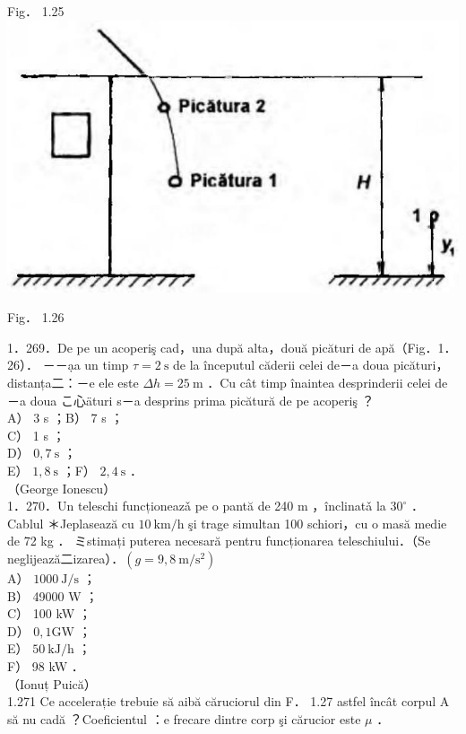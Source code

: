 \documentclass[10pt]{article}
\begin{document}
Fig． 1.25\\
\includegraphics[max width=\textwidth, center]{2025_07_01_5b3ff9fa0d508c8e9f17g-061(2)}

Fig． 1.26

1．269．De pe un acoperiş cad，una după alta，două picături de apă（Fig．1．26）． －－ạa un timp $\tau=2 \mathrm{~s}$ de la începutul căderii celei de－a doua picături，distanța二：－e ele este $\Delta h=25 \mathrm{~m}$ ．Cu cât timp înaintea desprinderii celei de－a doua こ心äturi s－a desprins prima picătură de pe acoperiş ？\\
A） 3 s ；B） 7 s ；\\
C） 1 s ；\\
D） $0,7 \mathrm{~s}$ ；\\
E） $1,8 \mathrm{~s}$ ；F） $2,4 \mathrm{~s}$ ．\\
（George Ionescu）\\
1．270．Un teleschi funcționeazǎ pe o pantă de 240 m ，înclinatǎ la $30^{\circ}$ ．Cablul ＊Jeplasează cu $10 \mathrm{~km} / \mathrm{h}$ şi trage simultan 100 schiori，cu o masă medie de 72 kg ． ミstimați puterea necesară pentru funcționarea teleschiului．（Se neglijează二izarea）．$\left(g=9,8 \mathrm{~m} / \mathrm{s}^{2}\right)$\\
A） $1000 \mathrm{~J} / \mathrm{s}$ ；\\
B） 49000 W ；\\
C） 100 kW ；\\
D） $0,1 \mathrm{GW}$ ；\\
E） $50 \mathrm{~kJ} / \mathrm{h}$ ；\\
F） 98 kW ．\\
（Ionuț Puică）\\
1.271 Ce accelerație trebuie să aibă căruciorul din F． 1.27 astfel încât corpul A să nu cadă ？Coeficientul ：e frecare dintre corp şi cărucior este $\mu$ ．
\end{document}
